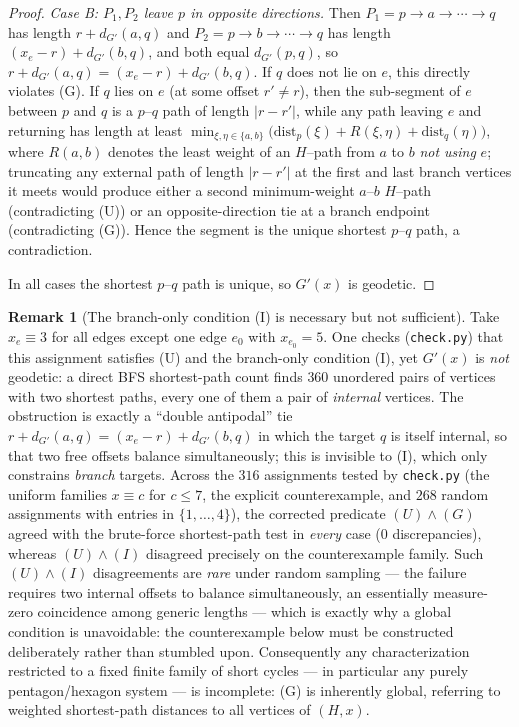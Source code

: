 \documentclass{amsart}
\theoremstyle{definition}
\newtheorem{remark}{Remark}
\begin{document}
\begin{proof}
\emph{Case B: $P_1,P_2$ leave $p$ in opposite directions.} Then
$P_1=p\to a\to\cdots\to q$ has length $r+d_{G'}(a,q)$ and
$P_2=p\to b\to\cdots\to q$ has length $(x_e-r)+d_{G'}(b,q)$, and both equal
$d_{G'}(p,q)$, so $r+d_{G'}(a,q)=(x_e-r)+d_{G'}(b,q)$. If $q$ does not lie on
$e$, this directly violates (G). If $q$ lies on $e$ (at some offset $r'\ne r$),
then the sub-segment of $e$ between $p$ and $q$ is a $p$--$q$ path of length
$|r-r'|$, while any path leaving $e$ and returning has length at least
$\min_{\xi,\eta\in\{a,b\}}\big(\mathrm{dist}_p(\xi)+R(\xi,\eta)
+\mathrm{dist}_q(\eta)\big)$, where $R(a,b)$ denotes the least weight of an
$H$--path from $a$ to $b$ \emph{not using} $e$; truncating any external path of
length $|r-r'|$ at the first and last branch vertices it meets would produce
either a second minimum-weight $a$--$b$ $H$--path (contradicting (U)) or an
opposite-direction tie at a branch endpoint (contradicting (G)). Hence the
segment is the unique shortest $p$--$q$ path, a contradiction.

In all cases the shortest $p$--$q$ path is unique, so $G'(x)$ is geodetic.
\end{proof}

\begin{remark}[The branch-only condition (I) is necessary but not
sufficient]\label{rem:counterex}
Take $x_e\equiv3$ for all edges except one edge $e_0$ with $x_{e_0}=5$. One
checks (\texttt{check.py}) that this assignment satisfies (U) and the branch-only
condition (I), yet $G'(x)$ is \emph{not} geodetic: a direct BFS shortest-path
count finds $360$ unordered pairs of vertices with two shortest paths, every one
of them a pair of \emph{internal} vertices. The obstruction is exactly a
``double antipodal'' tie
$r+d_{G'}(a,q)=(x_e-r)+d_{G'}(b,q)$ in which the target $q$ is itself internal,
so that two free offsets balance simultaneously; this is invisible to (I), which
only constrains \emph{branch} targets. Across the $316$ assignments tested by
\texttt{check.py} (the uniform families $x\equiv c$ for $c\le7$, the explicit
counterexample, and $268$ random assignments with entries in $\{1,\dots,4\}$),
the corrected predicate $(U)\wedge(G)$ agreed with the brute-force shortest-path
test in \emph{every} case ($0$ discrepancies), whereas $(U)\wedge(I)$ disagreed
precisely on the counterexample family. Such $(U)\wedge(I)$ disagreements are
\emph{rare} under random sampling --- the failure requires two internal offsets
to balance simultaneously, an essentially measure-zero coincidence among generic
lengths --- which is exactly why a global condition is unavoidable: the
counterexample below must be constructed deliberately rather than stumbled upon.
Consequently any characterization restricted to a fixed finite
family of short cycles --- in particular any purely pentagon/hexagon system ---
is incomplete: (G) is inherently global, referring to weighted shortest-path
distances to all vertices of $(H,x)$.
\end{remark}
\end{document}

